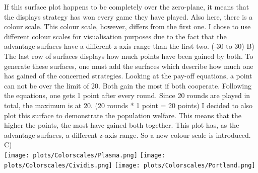 \documentclass{article}
\begin{document}
If this surface plot happens to be completely over the zero-plane, it means that the displays strategy has won every game they have played.
Also here, there is a colour scale.
This colour scale, however, differs from the first one.
I chose to use different colour scales for visualisation purposes due to the fact that the advantage surfaces have a different z-axis range than the first two.
(-30 to 30)
B)\\
The last row of surfaces displays how much points have been gained by both.
To generate these surfaces, one must add the surfaces which describe how much one has gained of the concerned strategies.
Looking at the pay-off equations, a point can not be over the limit of 20.
Both gain the most if both cooperate.
Following the equations, one gets 1 point after every round.
Since 20 rounds are played in total, the maximum is at 20.
(20 rounds * 1 point = 20 points)
I decided to also plot this surface to demonstrate the population welfare.
This means that the higher the points, the most have gained both together.
This plot has, as the advantage surfaces, a different z-axis range.
So a new colour scale is introduced.
C)\\
\texttt{[image: plots/Colorscales/Plasma.png]}
\texttt{[image: plots/Colorscales/Cividis.png]}
\texttt{[image: plots/Colorscales/Portland.png]}

\newpage

\def \w {0.16}
\def \a {45}
\end{document}
